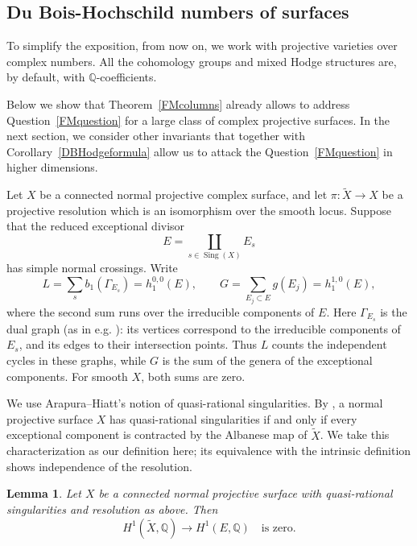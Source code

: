 \documentclass{amsart}
\theoremstyle{plain}
\newtheorem{lemma}[prop]{Lemma}
\theoremstyle{definition}
\newcommand{\bbQ}{\mathbb{Q}}
\DeclareMathOperator{\Sing}{Sing}
\begin{document}
\medskip

\subsection{Du Bois-Hochschild numbers of surfaces}

To simplify the exposition, from now on, we work with projective varieties over complex numbers. All the cohomology groups and mixed Hodge structures are, by default, with $\bbQ$-coefficients.

Below we show that Theorem~\ref{FMcolumns} already allows to address Question~\ref{FMquestion} for a large class of complex projective surfaces. In the next section, we consider other invariants that together with Corollary~\ref{DBHodgeformula}  allow us to attack the Question~\ref{FMquestion} in higher dimensions.

\medskip

Let $X$ be a connected normal projective complex surface, and let
$\pi:\widetilde X\to X$ be a projective resolution which is an isomorphism over the smooth locus. Suppose that the reduced exceptional divisor
\[
E=\coprod_{s\in\Sing(X)}E_s
\]
has simple normal crossings. Write
\begin{equation}\label{curveHodgenumbers}
L=\sum_s b_1(\Gamma_{E_s})=h^{0,0}_1(E),\qquad
G=\sum_{E_j\subset E}g(E_j)=h^{1,0}_1(E),
\end{equation}
where the second sum runs over the irreducible components of $E$.
Here $\Gamma_{E_s}$ is the dual graph (as in e.g.  \cite{Wei01}): its vertices correspond to the irreducible components of $E_s$, and its edges to their intersection points. Thus $L$ counts the independent cycles in these graphs, while $G$ is the sum of the genera of the exceptional components. For smooth $X$, both sums are zero.

We use Arapura--Hiatt's notion of quasi-rational singularities.
By \cite[Corollary 5.4]{AH26}, a normal projective surface $X$
has quasi-rational singularities if and only if every exceptional component is contracted by the Albanese map of $\widetilde X$.
We take this characterization as our definition here; its equivalence with the intrinsic definition
\cite[Definition 5.1]{AH26} shows independence of the resolution.

\begin{lemma}\label{qratvanishing}
Let $X$ be a connected normal projective surface with quasi-rational singularities and resolution as above. Then
\begin{equation}\label{eqsurfacerestriction}
H^1(\widetilde X,\bbQ)\longrightarrow H^1(E,\bbQ)
\quad\text{is zero}.
\end{equation}
\end{lemma}
\end{document}
